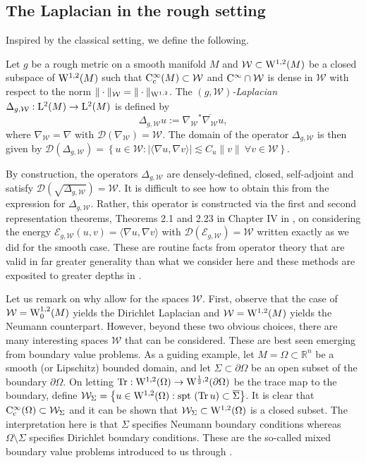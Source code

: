 \documentclass[AMS,STIX1COL]{WileyNJD-v2}
\numberwithin{equation}{section}
\renewcommand{\~}{\tilde}
\renewcommand{\-}{\bar}
\newcommand{\R}{\mathbb{R}}
\newcommand{\8}{\infty}
\newcommand{\cW}{\mathcal{W}}
\DeclareMathOperator{\Tr}{Tr}
\newcommand{\dbrac}[1]{\left\{#1\right\}}
\newcommand{\modulus}[1]{|#1|}
\newcommand{\set}[1]{\dbrac{#1}}
\newcommand{\dom}{ {\mathcal{D}}}
\newcommand{\script}[1]{\mathscr{#1}}
\newcommand{\close}[1]{\overline{#1}}		%
\newcommand{\norm}[1]{\| #1 \|}			%
\newcommand{\spt}[1]{{\rm spt} {\text{ }}#1}	%
\newcommand{\adj}[1]{{#1}^\ast}			%
\newcommand{\inprod}[1]{\langle #1 \rangle}	%
\newcommand{\Lp}[2][{}]{{\rm L}^{#2}_{\rm #1}}		%
\newcommand{\Ck}[2][{}]{{\rm C}^{#2}_{\rm #1}}		%
\newcommand{\Sob}[2][{}]{{\rm W}^{#2}_{\rm #1}}		%
\newcommand{\SobH}[2][{}]{{\Sob[#1]{#2,2}}}	%
\newcommand{\sE}{\script{E}}
\begin{document}
\subsection{The Laplacian in the rough setting}
Inspired by the classical setting, we define
the following.
 
\begin{defn}[$(g,\cW)$-Laplacian]
Let \(g\) be a rough metric on a smooth manifold \(M\)
and $\cW \subset \SobH{1}(M)$ be a closed subspace
of $\SobH{1}(M)$ such that $\Ck[c]{\infty}(M) \subset \cW$
and $\Ck{\infty} \cap \cW$ is dense in $\cW$ with respect to the norm $\norm{\cdot}_{\cW} = \norm{\cdot}_{\SobH{1}}$. The \emph{$(g,\cW)$-Laplacian}
\(\Delta_{g,\cW} : \Lp{2}(M) \to \Lp{2}(M)\) is defined by
\[
\Delta_{g,\cW} u := \adj{\nabla_{\cW}} \close{ \nabla_{\cW}} u,
\]
where  $\nabla_{\cW} = \nabla$ with $\dom(\nabla_{\cW}) = \cW$. 
The domain of the operator $\Delta_{g,\cW}$ is then given by
$\dom(\Delta_{g,\cW}) = \set{u \in \cW: \modulus{\inprod{\nabla u, \nabla v}} \lesssim C_u \norm{v}\ \forall v \in \cW}.$
\end{defn}

By construction, the  operators $\Delta_{g,\cW}$ 
are densely-defined, closed, self-adjoint and satisfy 
$\dom(\sqrt{\Delta_{g,\cW}}) = \cW$.
It is difficult to see how to obtain this from the expression for $\Delta_{g,\cW}$.
Rather, this operator is constructed via the first and second representation 
theorems, Theorems 2.1 and 2.23 in Chapter IV in \cite{Kato}, on considering the   
energy $\sE_{g,\cW}(u,v) = \inprod{\nabla u, \nabla v}$ 
with $\dom(\sE_{g,\cW}) = \cW$ written exactly as we did for the smooth case.
These are routine facts from operator theory that are valid in far greater generality 
than what we consider here and these methods are exposited to 
greater depths in \cite{Yosida, Kato}.
 
Let us remark on why allow for the spaces \(\cW\). First, observe that the case of $\cW = \SobH[0]{1}(M)$
yields the Dirichlet Laplacian
and $\cW = \SobH{1}(M)$ yields the Neumann counterpart.
However, beyond these two obvious choices, 
there are many interesting spaces $\cW$ that
can be considered. These are best
seen emerging from boundary value problems.
As a guiding example, let $M = \Omega \subset \R^n$
be a smooth (or Lipschitz) bounded domain, and let $\Sigma \subset \partial \Omega$
be an open subset of the boundary $\partial \Omega$.
On letting $\Tr: \SobH{1}(\Omega) \to \SobH{\frac{1}{2}}(\partial \Omega)$
be the trace map to the boundary, define 
$\cW_{\Sigma} = \set{u \in \SobH{1}(\Omega): \spt (\Tr u) \subset \close{\Sigma}}$. 
It is clear that $\Ck[c]{\infty}(\Omega) \subset \cW_{\Sigma}$ and
it can be shown that $\cW_{\Sigma} \subset \SobH{1}(\Omega)$
is a closed subset. 
The interpretation here is that $\Sigma$ specifies Neumann boundary conditions whereas $\Omega \setminus \Sigma$
specifies Dirichlet boundary conditions. 
These are the so-called mixed boundary value problems 
introduced to us through \cite{AKM2}.
\end{document}
